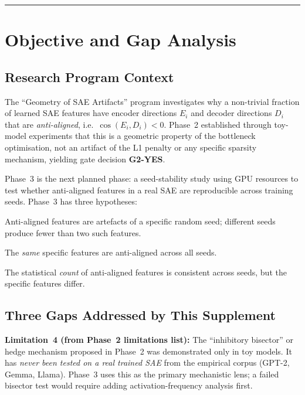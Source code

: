\documentclass[11pt,a4paper]{article}
\newcommand{\cosED}{\cos(E_i, D_i)}
\begin{document}
\vspace{0.5em}\hrule\vspace{0.5em}
\tableofcontents
\newpage

\section{Objective and Gap Analysis}
\label{sec:objective}

\subsection{Research Program Context}

The ``Geometry of SAE Artifacts'' program investigates why a non-trivial fraction of
learned SAE features have encoder directions $E_i$ and decoder directions $D_i$ that
are \emph{anti-aligned}, i.e.\ $\cosED < 0$.  Phase~2 established through toy-model
experiments that this is a geometric property of the bottleneck optimisation, not an
artifact of the L1 penalty or any specific sparsity mechanism, yielding gate decision
\textbf{G2-YES}.

Phase~3 is the next planned phase: a seed-stability study using GPU resources to test
whether anti-aligned features in a real SAE are reproducible across training seeds.
Phase~3 has three hypotheses:
\begin{description}[leftmargin=1em,noitemsep]
  \item[$H_{\mathrm{UNSTABLE}}$] Anti-aligned features are artefacts of a specific
    random seed; different seeds produce fewer than two such features.
  \item[$H_{\mathrm{STABLE}}$] The \emph{same} specific features are anti-aligned
    across all seeds.
  \item[$H_{\mathrm{STAT\_STABLE}}$] The statistical \emph{count} of anti-aligned
    features is consistent across seeds, but the specific features differ.
\end{description}

\subsection{Three Gaps Addressed by This Supplement}

\begin{limitation}
\textbf{Limitation~4 (from Phase~2 limitations list):} The ``inhibitory bisector'' or
hedge mechanism proposed in Phase~2 was demonstrated only in toy models.  It has
\emph{never been tested on a real trained SAE} from the empirical corpus (GPT-2,
Gemma, Llama).  Phase~3 uses this as the primary mechanistic lens; a failed bisector
test would require adding activation-frequency analysis first.
\end{limitation}
\end{document}
